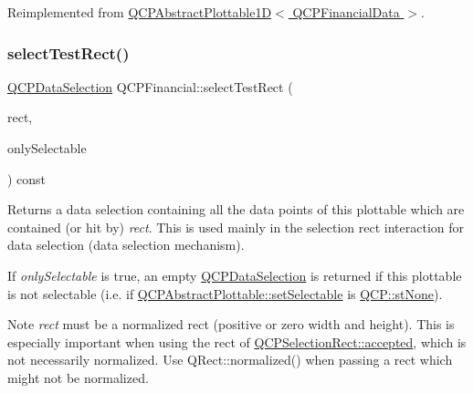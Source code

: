 Reimplemented from \hyperlink{class_q_c_p_abstract_plottable1_d_a071e2df66ba1746067dfcb5e27947b43}{Q\+C\+P\+Abstract\+Plottable1\+D$<$ Q\+C\+P\+Financial\+Data $>$}.

\mbox{\label{class_q_c_p_financial_a3c5beb1ab028a1dba845fc9dcffc7cf4}} 
\subsubsection{\texorpdfstring{select\+Test\+Rect()}{selectTestRect()}\hspace{0.1cm}{\footnotesize\ttfamily [1/2]}}
{\footnotesize\ttfamily \hyperlink{class_q_c_p_data_selection}{Q\+C\+P\+Data\+Selection} Q\+C\+P\+Financial\+::select\+Test\+Rect (\begin{DoxyParamCaption}\item[{const Q\+RectF \&}]{rect,  }\item[{bool}]{only\+Selectable }\end{DoxyParamCaption}) const\hspace{0.3cm}{\ttfamily [virtual]}}





Returns a data selection containing all the data points of this plottable which are contained (or hit by) {\itshape rect}. This is used mainly in the selection rect interaction for data selection (data selection mechanism).

If {\itshape only\+Selectable} is true, an empty \hyperlink{class_q_c_p_data_selection}{Q\+C\+P\+Data\+Selection} is returned if this plottable is not selectable (i.\+e. if \hyperlink{class_q_c_p_abstract_plottable_ac238d6e910f976f1f30d41c2bca44ac3}{Q\+C\+P\+Abstract\+Plottable\+::set\+Selectable} is \hyperlink{namespace_q_c_p_ac6cb9db26a564b27feda362a438db038a2cb7996ccc6c39b9e6d20f2e46bf3f57}{Q\+C\+P\+::st\+None}).

\begin{DoxyNote}{Note}
{\itshape rect} must be a normalized rect (positive or zero width and height). This is especially important when using the rect of \hyperlink{class_q_c_p_selection_rect_a15a43542e1f7b953a44c260b419e6d2c}{Q\+C\+P\+Selection\+Rect\+::accepted}, which is not necessarily normalized. Use {\ttfamily Q\+Rect\+::normalized()} when passing a rect which might not be normalized. 
\end{DoxyNote}



